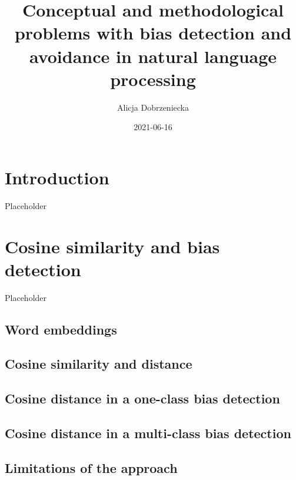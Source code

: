 \documentclass[
  12pt,
]{book}
\title{Conceptual and methodological problems with bias detection and avoidance in natural language processing}
\author{Alicja Dobrzeniecka}
\date{2021-06-16}
\begin{document}
\maketitle

{
\setcounter{tocdepth}{5}
\tableofcontents
}
\hypertarget{introduction}{%
\chapter{Introduction}\label{introduction}}

Placeholder

\hypertarget{cosine-similarity-and-bias-detection}{%
\chapter{Cosine similarity and bias detection}\label{cosine-similarity-and-bias-detection}}

Placeholder

\hypertarget{word-embeddings}{%
\section{Word embeddings}\label{word-embeddings}}

\hypertarget{cosine-similarity-and-distance}{%
\section{Cosine similarity and distance}\label{cosine-similarity-and-distance}}

\hypertarget{cosine-distance-in-a-one-class-bias-detection}{%
\section{Cosine distance in a one-class bias detection}\label{cosine-distance-in-a-one-class-bias-detection}}

\hypertarget{cosine-distance-in-a-multi-class-bias-detection}{%
\section{Cosine distance in a multi-class bias detection}\label{cosine-distance-in-a-multi-class-bias-detection}}

\hypertarget{limitations-of-the-approach}{%
\section{Limitations of the approach}\label{limitations-of-the-approach}}
\end{document}
